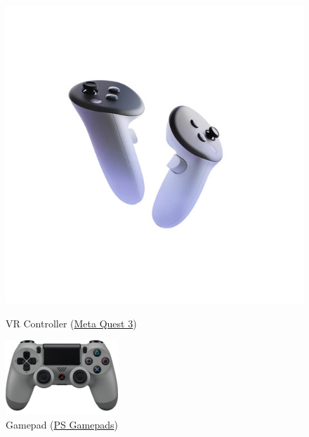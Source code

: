 \begin{figure}[h!]
  \centering
  \begin{minipage}{0.48\textwidth}
    \centering
    \includegraphics[width=0.35\linewidth]{Background/Quest-3-controllers.png.jpg} %
            \captionsetup{justification=centering}

    \caption{VR Controller (\href{https://www.meta.com/de/en/quest/accessories/quest-touch-plus-controller/}{Meta Quest 3})}
  \end{minipage}\hfill
  \begin{minipage}{0.48\textwidth}
    \centering
    \includegraphics[width=0.4\linewidth]{Background/ps4_controller_png_13_1058.png} %
        \captionsetup{justification=centering}

    \caption{ Gamepad (\href{https://www.playstation.com/de-de/accessories/playstation-vr-aim-controller/}{PS Gamepads})}
  \end{minipage}


\end{figure}
